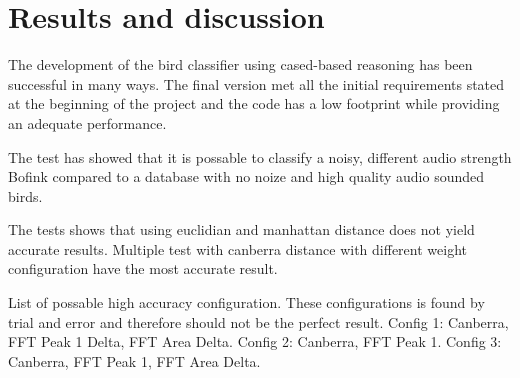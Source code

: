 \section{Results and discussion}
The development of the bird classifier using cased-based reasoning has
been successful in many ways. The final version met all the initial requirements
stated at the beginning of the project and the code has a low footprint while
providing an adequate performance.

The test has showed that it is possable to classify a noisy, different audio strength Bofink compared to a database with no noize and high quality audio sounded birds.

The tests shows that using euclidian and manhattan distance does not yield accurate results.
Multiple test with canberra distance with different weight configuration have the most accurate result.

List of possable high accuracy configuration.
These configurations is found by trial and error and therefore should not be the perfect result.
Config 1: Canberra, FFT Peak 1 Delta, FFT Area Delta.
Config 2: Canberra, FFT Peak 1.
Config 3: Canberra, FFT Peak 1, FFT Area Delta.
